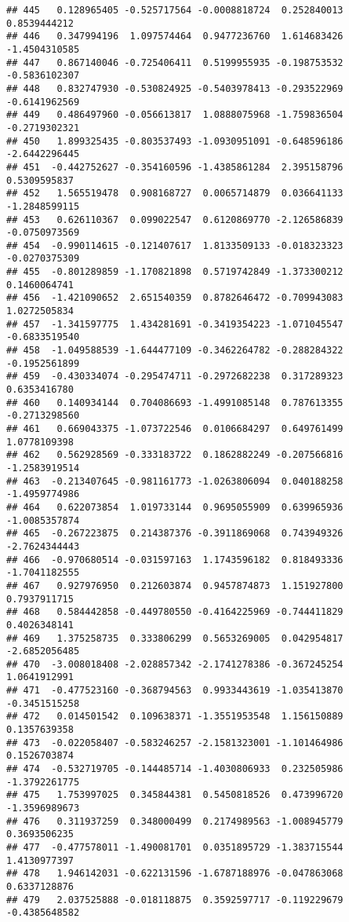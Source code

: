\documentclass[
]{article}
\begin{document}
\begin{verbatim}
## 445   0.128965405 -0.525717564 -0.0008818724  0.252840013  0.8539444212
## 446   0.347994196  1.097574464  0.9477236760  1.614683426 -1.4504310585
## 447   0.867140046 -0.725406411  0.5199955935 -0.198753532 -0.5836102307
## 448   0.832747930 -0.530824925 -0.5403978413 -0.293522969 -0.6141962569
## 449   0.486497960 -0.056613817  1.0888075968 -1.759836504 -0.2719302321
## 450   1.899325435 -0.803537493 -1.0930951091 -0.648596186 -2.6442296445
## 451  -0.442752627 -0.354160596 -1.4385861284  2.395158796  0.5309595837
## 452   1.565519478  0.908168727  0.0065714879  0.036641133 -1.2848599115
## 453   0.626110367  0.099022547  0.6120869770 -2.126586839 -0.0750973569
## 454  -0.990114615 -0.121407617  1.8133509133 -0.018323323 -0.0270375309
## 455  -0.801289859 -1.170821898  0.5719742849 -1.373300212  0.1460064741
## 456  -1.421090652  2.651540359  0.8782646472 -0.709943083  1.0272505834
## 457  -1.341597775  1.434281691 -0.3419354223 -1.071045547 -0.6833519540
## 458  -1.049588539 -1.644477109 -0.3462264782 -0.288284322 -0.1952561899
## 459  -0.430334074 -0.295474711 -0.2972682238  0.317289323  0.6353416780
## 460   0.140934144  0.704086693 -1.4991085148  0.787613355 -0.2713298560
## 461   0.669043375 -1.073722546  0.0106684297  0.649761499  1.0778109398
## 462   0.562928569 -0.333183722  0.1862882249 -0.207566816 -1.2583919514
## 463  -0.213407645 -0.981161773 -1.0263806094  0.040188258 -1.4959774986
## 464   0.622073854  1.019733144  0.9695055909  0.639965936 -1.0085357874
## 465  -0.267223875  0.214387376 -0.3911869068  0.743949326 -2.7624344443
## 466  -0.970680514 -0.031597163  1.1743596182  0.818493336 -1.7041182555
## 467   0.927976950  0.212603874  0.9457874873  1.151927800  0.7937911715
## 468   0.584442858 -0.449780550 -0.4164225969 -0.744411829  0.4026348141
## 469   1.375258735  0.333806299  0.5653269005  0.042954817 -2.6852056485
## 470  -3.008018408 -2.028857342 -2.1741278386 -0.367245254  1.0641912991
## 471  -0.477523160 -0.368794563  0.9933443619 -1.035413870 -0.3451515258
## 472   0.014501542  0.109638371 -1.3551953548  1.156150889  0.1357639358
## 473  -0.022058407 -0.583246257 -2.1581323001 -1.101464986  0.1526703874
## 474  -0.532719705 -0.144485714 -1.4030806933  0.232505986 -1.3792261775
## 475   1.753997025  0.345844381  0.5450818526  0.473996720 -1.3596989673
## 476   0.311937259  0.348000499  0.2174989563 -1.008945779  0.3693506235
## 477  -0.477578011 -1.490081701  0.0351895729 -1.383715544  1.4130977397
## 478   1.946142031 -0.622131596 -1.6787188976 -0.047863068  0.6337128876
## 479   2.037525888 -0.018118875  0.3592597717 -0.119229679 -0.4385648582

\end{verbatim}
\end{document}
